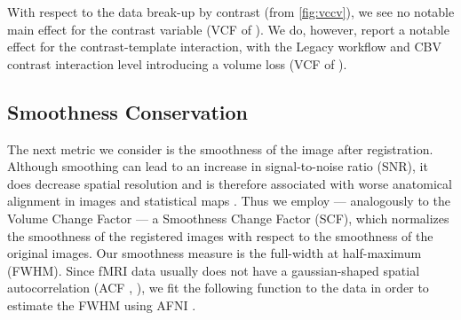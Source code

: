 With respect to the data break-up by contrast (from \cref{fig:vccv}), we see no notable main effect for the contrast variable
(VCF of ).
We do, however, report a notable effect for the contrast-template interaction, with the Legacy workflow and CBV contrast interaction level introducing a volume loss
(VCF of ).


\subsection{Smoothness Conservation}

\begin{sansmath}
\end{sansmath}

The next metric we consider is the smoothness of the image after registration.
Although smoothing can lead to an increase in signal-to-noise ratio (SNR), it does decrease spatial resolution and is therefore associated with  worse anatomical alignment in images and statistical maps \cite{fmriprep}.
Thus we employ --- analogously to the Volume Change Factor --- a Smoothness Change Factor (SCF), which normalizes the smoothness of the registered images with respect to the smoothness of the original images.
Our smoothness measure is the full-width at half-maximum (FWHM).
Since fMRI data usually does not have a gaussian-shaped spatial autocorrelation (ACF \cite{eklund2016cluster}, \cite{cox2017fmri}), we fit the following function to the data in order to estimate the FWHM using AFNI \cite{cox1996afni}.

